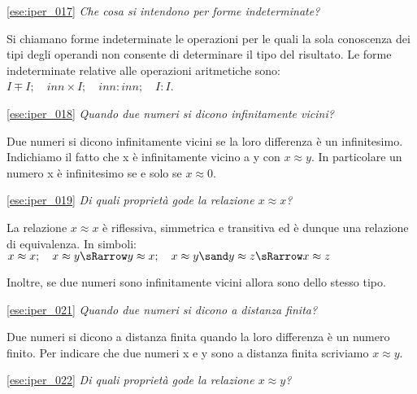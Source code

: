 \ref{ese:iper_017} 
\emph{Che cosa si intendono per forme indeterminate?}

Si chiamano forme indeterminate le operazioni per le quali la sola conoscenza 
dei tipi degli operandi non consente di determinare il tipo del risultato. Le 
forme indeterminate relative alle operazioni aritmetiche sono:
\(I \mp I; \quad inn \times I; \quad inn : inn; \quad I : I\).

\ref{ese:iper_018} 
\emph{Quando due numeri si dicono infinitamente vicini?}

Due numeri si dicono infinitamente vicini se la loro differenza è un 
infinitesimo. Indichiamo il fatto che x è infinitamente vicino a y con 
\(x \approx y\). 
In particolare un numero x è infinitesimo se e solo se \(x \approx 0\).

\ref{ese:iper_019} 
\emph{Di quali proprietà gode la relazione \(x \approx x\)?}

La relazione \(x \approx x\) è riflessiva, simmetrica e transitiva ed è 
dunque 
una relazione di equivalenza. In simboli:\\
\(x \approx x; \quad 
  x \approx y \sRarrow y \approx x; \quad
  x \approx y \sand y \approx z \sRarrow x \approx z\)
  
Inoltre, se due numeri sono infinitamente vicini allora sono dello stesso 
tipo.

% 

\ref{ese:iper_021} 
\emph{Quando due numeri si dicono a distanza finita?}

Due numeri si dicono a distanza finita quando la loro differenza è un numero 
finito. 
Per indicare che due numeri x e y sono a distanza finita scriviamo 
\(x \approx y\).

\ref{ese:iper_022} 
\emph{Di quali proprietà gode la relazione \(x \approx y\)?}

